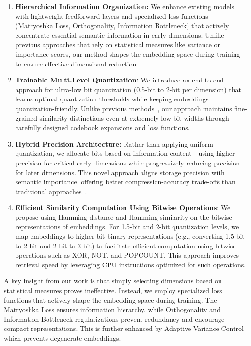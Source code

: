 \begin{enumerate}
    \item \textbf{Hierarchical Information Organization:} We enhance existing models with lightweight feedforward layers and specialized loss functions (Matryoshka Loss, Orthogonality, Information Bottleneck) that actively concentrate essential semantic information in early dimensions. Unlike previous approaches that rely on statistical measures like variance or importance scores, our method shapes the embedding space during training to ensure effective dimensional reduction.
    
    \item \textbf{Trainable Multi-Level Quantization:} We introduce an end-to-end approach for ultra-low bit quantization (0.5-bit to 2-bit per dimension) that learns optimal quantization thresholds while keeping embeddings quantization-friendly. 
    Unlike previous methods~\cite{shen2018nash, shu2018compressing}, our approach maintains fine-grained similarity distinctions even at extremely low bit widths through carefully designed codebook expansions and loss functions.
    
    \item \textbf{Hybrid Precision Architecture:} Rather than applying uniform quantization, we allocate bits based on information content - using higher precision for critical early dimensions while progressively reducing precision for later dimensions. 
    This novel approach aligns storage precision with semantic importance, offering better compression-accuracy trade-offs than traditional approaches~\cite{jaderberg2014speeding, sainath2013low}.
    
    \item \textbf{Efficient Similarity Computation Using Bitwise Operations}: We propose using Hamming distance and Hamming similarity on the bitwise representations of embeddings. For 1.5-bit and 2-bit quantization levels, we map embeddings to higher-bit binary representations (e.g., converting 1.5-bit to 2-bit and 2-bit to 3-bit) to facilitate efficient computation using bitwise operations such as XOR, NOT, and POPCOUNT. 
    This approach improves retrieval speed by leveraging CPU instructions optimized for such operations.  
\end{enumerate}

A key insight from our work is that simply selecting dimensions based on statistical measures proves ineffective. Instead, we employ specialized loss functions that actively shape the embedding space during training. The Matryoshka Loss ensures information hierarchy, while Orthogonality and Information Bottleneck regularizations prevent redundancy and encourage compact representations. This is further enhanced by Adaptive Variance Control which prevents degenerate embeddings.

